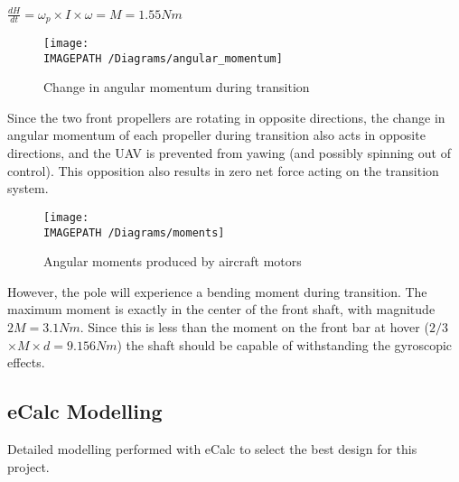 $\frac{dH}{dt} = \omega_p \times I \times \omega = M = 1.55Nm$\\

\begin{figure}[!ht]
	\centering
	\texttt{[image: \\IMAGEPATH /Diagrams/angular\_momentum]}
	\caption{Change in angular momentum during transition}
	\label{fig:momentum}
\end{figure}

Since the two front propellers are rotating in opposite directions, the change in angular momentum of each propeller during transition also acts in opposite directions, and the UAV is prevented from yawing (and possibly spinning out of control). This opposition also results in zero net force acting on the transition system.\\

\begin{figure}[!ht]
	\centering
	\texttt{[image: \\IMAGEPATH /Diagrams/moments]}
	\caption{Angular moments produced by aircraft motors}
	\label{fig:moments}
\end{figure}

However, the pole will experience a bending moment during transition. The maximum moment is exactly in the center of the front shaft, with magnitude $2M = 3.1Nm$. Since this is less than the moment on the front bar at hover ($2/3$ $\times M \times d = 9.156Nm$) the shaft should be capable of withstanding the gyroscopic effects.\\

\subsection{eCalc Modelling}
\label{sec:ecalc}
Detailed modelling performed with eCalc to select the best design for this project.\\

